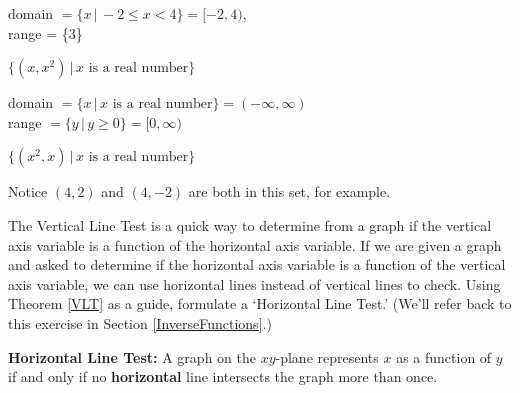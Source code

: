 \documentclass{ximera}
\begin{document}
\begin{question}
\begin{problem}
\begin{multipleChoice}
    \begin{feedback}
    \begin{solution}
       domain  $= \{x \, | \, -2 \leq x < 4 \} = [-2, 4)$, \\ range = \{$3$\} 
    \end{solution}
    \end{feedback}
\end{multipleChoice}
\end{problem}    


\begin{problem}
$\{ \left(x,x^2\right) \, | \, \text{$x$ is a real number} \}$

\begin{multipleChoice}
    \begin{feedback}
    \begin{solution}
       domain $= \{x \, | \,  \text{$x$ is a real number} \} = (-\infty, \infty)$ \\  range $= \{y \, | \,  y \geq 0 \} = [0,\infty)$ 
    \end{solution}
    \end{feedback}
\end{multipleChoice}
\end{problem}    

\begin{problem}\label{setfunctionlast}
$\{ \left(x^2,x\right) \, | \, \text{$x$ is a real number} \}$

\begin{multipleChoice}
    \begin{feedback}
       Notice $(4,2)$ and $(4,-2)$ are both in this set, for example. 
    \end{feedback}
\end{multipleChoice}
\end{problem}    
    
\end{question}
\begin{problem}\label{HLTExercise} The Vertical Line Test is a quick way to determine from a graph if the vertical axis variable is a function of the horizontal axis variable. If we are given a graph and asked to determine if the horizontal axis variable is a function of the vertical axis variable, we can use horizontal lines instead of vertical lines to check.  Using Theorem \ref{VLT} as a guide,  formulate a `Horizontal Line Test.'  (We'll refer back to this exercise in Section \ref{InverseFunctions}.)

\begin{solution}
\textbf{Horizontal Line Test:} A graph on the $xy$-plane represents $x$ as a function of $y$ if and only if no \textbf{horizontal} line intersects the graph more than once.
\end{solution}
\end{problem}
\end{document}
